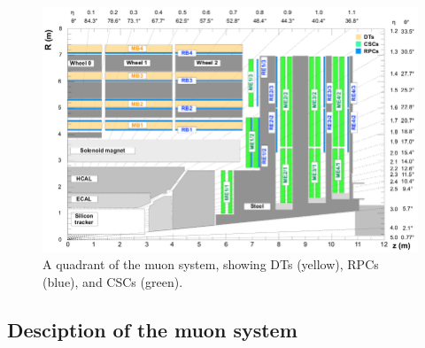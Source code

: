 	\begin{figure}[H]
		\centering
		\includegraphics[width=0.9\linewidth]{fig/chapt2/Muon_quadrant.png}
		\caption{\label{fig:Quadrant} A quadrant of the muon system, showing DTs (yellow), RPCs (blue), and CSCs (green).}
	\end{figure}
	
	\subsection{Desciption of the muon system}
	\label{chapt4:ssec:muonsystem}
	
